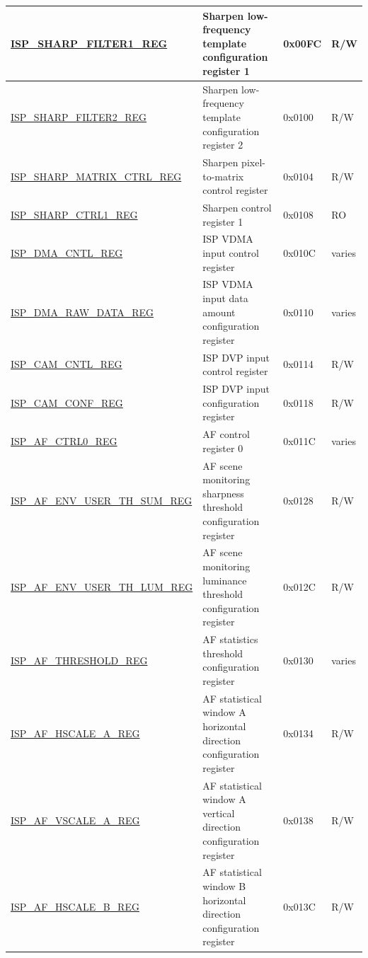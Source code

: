 \begin{longtable}{ | p{6cm} | p{7.2cm} | p{1.3cm} | p{1cm} | }
\hyperref[regdesc:ISPSHARPFILTER1REG]{ISP\_SHARP\_FILTER1\_REG} & Sharpen low-frequency template configuration register 1 & 0x00FC & R/W \\ \hline
\hyperref[regdesc:ISPSHARPFILTER2REG]{ISP\_SHARP\_FILTER2\_REG} & Sharpen low-frequency template configuration register 2 & 0x0100 & R/W \\ \hline
\hyperref[regdesc:ISPSHARPMATRIXCTRLREG]{ISP\_SHARP\_MATRIX\_CTRL\_REG} & Sharpen pixel-to-matrix control register & 0x0104 & R/W \\ \hline
\hyperref[regdesc:ISPSHARPCTRL1REG]{ISP\_SHARP\_CTRL1\_REG} & Sharpen control register 1 & 0x0108 & RO \\ \hline
\hyperref[regdesc:ISPDMACNTLREG]{ISP\_DMA\_CNTL\_REG} & ISP VDMA input control register & 0x010C & varies \\ \hline
\hyperref[regdesc:ISPDMARAWDATAREG]{ISP\_DMA\_RAW\_DATA\_REG} & ISP VDMA input data amount configuration register & 0x0110 & varies \\ \hline
\hyperref[regdesc:ISPCAMCNTLREG]{ISP\_CAM\_CNTL\_REG} & ISP DVP input control register & 0x0114 & R/W \\ \hline
\hyperref[regdesc:ISPCAMCONFREG]{ISP\_CAM\_CONF\_REG} & ISP DVP input configuration register & 0x0118 & R/W \\ \hline
\hyperref[regdesc:ISPAFCTRL0REG]{ISP\_AF\_CTRL0\_REG} & AF control register 0 & 0x011C & varies \\ \hline
\hyperref[regdesc:ISPAFENVUSERTHSUMREG]{ISP\_AF\_ENV\_USER\_TH\_SUM\_REG} & AF scene monitoring sharpness threshold configuration register & 0x0128 & R/W \\ \hline
\hyperref[regdesc:ISPAFENVUSERTHLUMREG]{ISP\_AF\_ENV\_USER\_TH\_LUM\_REG} & AF scene monitoring luminance threshold configuration register & 0x012C & R/W \\ \hline
\hyperref[regdesc:ISPAFTHRESHOLDREG]{ISP\_AF\_THRESHOLD\_REG} & AF statistics threshold configuration register & 0x0130 & varies \\ \hline
\hyperref[regdesc:ISPAFHSCALEAREG]{ISP\_AF\_HSCALE\_A\_REG} & AF statistical window A horizontal direction configuration register & 0x0134 & R/W \\ \hline
\hyperref[regdesc:ISPAFVSCALEAREG]{ISP\_AF\_VSCALE\_A\_REG} & AF statistical window A vertical direction configuration register & 0x0138 & R/W \\ \hline
\hyperref[regdesc:ISPAFHSCALEBREG]{ISP\_AF\_HSCALE\_B\_REG} & AF statistical window B horizontal direction configuration register & 0x013C & R/W \\ \hline

\end{longtable}
